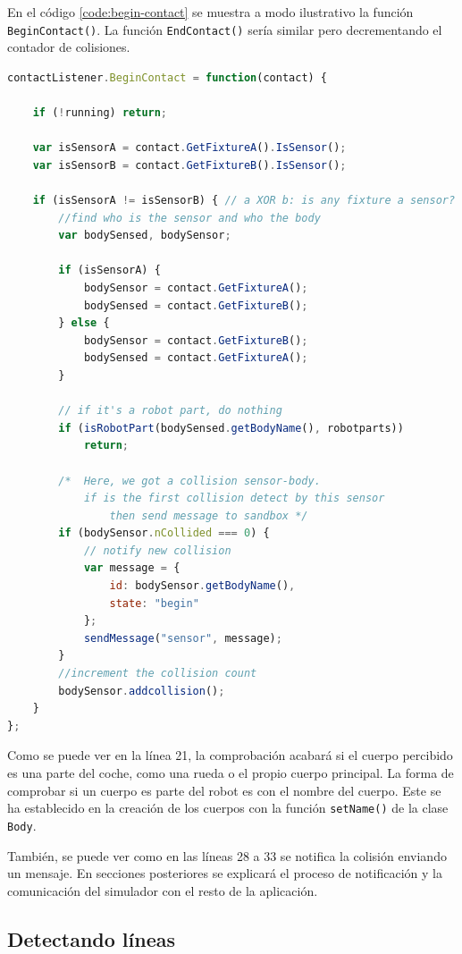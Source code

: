 En el código \ref{code:begin-contact} se muestra a modo ilustrativo la función \texttt{BeginContact()}. La función \texttt{EndContact()} sería similar pero decrementando el contador de colisiones.


\begin{lstlisting}[language={Javascript},label={code:begin-contact}, caption={Función \texttt{BeginContact()} definida para los sensores.}]
contactListener.BeginContact = function(contact) {

	if (!running) return;

	var isSensorA = contact.GetFixtureA().IsSensor();
	var isSensorB = contact.GetFixtureB().IsSensor();

	if (isSensorA != isSensorB) { // a XOR b: is any fixture a sensor?
		//find who is the sensor and who the body
		var bodySensed, bodySensor;

		if (isSensorA) {
			bodySensor = contact.GetFixtureA();
			bodySensed = contact.GetFixtureB();
		} else {
			bodySensor = contact.GetFixtureB();
			bodySensed = contact.GetFixtureA();
		}

		// if it's a robot part, do nothing
		if (isRobotPart(bodySensed.getBodyName(), robotparts))
			return;

		/*  Here, we got a collision sensor-body.
			if is the first collision detect by this sensor
				then send message to sandbox */
		if (bodySensor.nCollided === 0) {
			// notify new collision
			var message = {
				id: bodySensor.getBodyName(),
				state: "begin"
			};
			sendMessage("sensor", message);
		}
		//increment the collision count
		bodySensor.addcollision();
	}
};
\end{lstlisting}

Como se puede ver en la línea 21, la comprobación acabará si el cuerpo percibido es una parte del coche, como una rueda o el propio cuerpo principal. La forma de comprobar si un cuerpo es parte del robot es con el nombre del cuerpo. Este se ha establecido en la creación de los cuerpos con la función \texttt{setName()} de la clase \texttt{Body}.

También, se puede ver como en las líneas 28 a 33 se notifica la colisión enviando un mensaje. En secciones posteriores se explicará el proceso de notificación y la comunicación del simulador con el resto de la aplicación.

\subsection{Detectando líneas}
\label{detectando-lineas}

